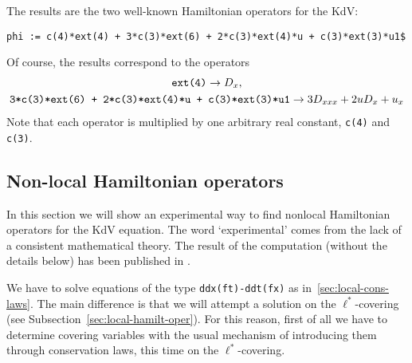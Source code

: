 \documentclass[12pt]{amsart}
\theoremstyle{definition}
\begin{document}
The results are the two well-known Hamiltonian operators for the KdV:
\begin{verbatim}
phi := c(4)*ext(4) + 3*c(3)*ext(6) + 2*c(3)*ext(4)*u + c(3)*ext(3)*u1$
\end{verbatim}
Of course, the results correspond to the operators
\begin{gather*}
  \text{\texttt{ext(4)}} \to D_x,\\
  \text{\texttt{3*c(3)*ext(6) +
  2*c(3)*ext(4)*u + c(3)*ext(3)*u1}} \to 3D_{xxx} + 2uD_{x} + u_x
\end{gather*}
Note that each operator is multiplied by one arbitrary real
constant, \texttt{c(4)} and \texttt{c(3)}.

\subsection{Non-local Hamiltonian operators}
\label{sec:non-local-hamilt}

In this section we will show an experimental way to find nonlocal Hamiltonian
operators for the KdV equation. The word `experimental' comes from the lack of
a consistent mathematical theory. The result of the computation (without the
details below) has been published in \cite{KKV}.

We have to solve equations of the type \texttt{ddx(ft)-ddt(fx)} as
in~\ref{sec:local-cons-laws}. The main difference is that we will attempt a
solution on the $\ell^*$-covering (see Subsection~\ref{sec:local-hamilt-oper}).
For this reason, first of all we have to determine covering variables with the
usual mechanism of introducing them through conservation laws, this time on the
$\ell^*$-covering.
\end{document}
